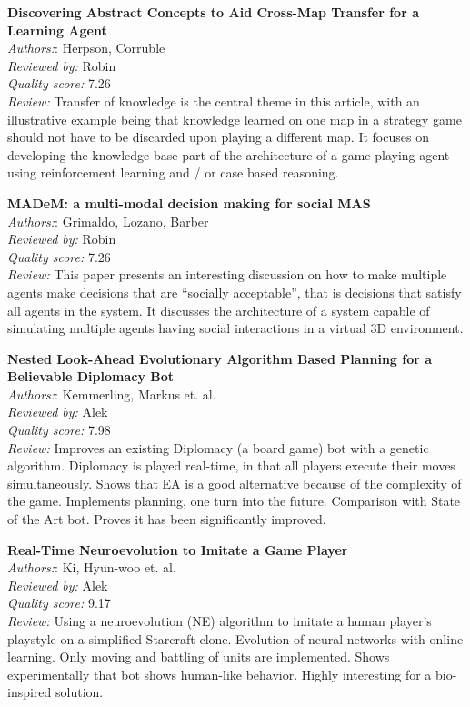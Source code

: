 \textbf{Discovering Abstract Concepts to Aid Cross-Map Transfer for a Learning Agent}\\
\textit{Authors:}: Herpson, Corruble\\
\textit{Reviewed by:} Robin\\
\textit{Quality score:} 7.26\\
\textit{Review:} Transfer of knowledge is the central theme in this article, with an illustrative example being that knowledge learned on one map in a strategy game should not have to be discarded upon playing a different map. It focuses on developing the knowledge base part of the architecture of a game-playing agent using reinforcement learning and / or case based reasoning.

\textbf{MADeM: a multi-modal decision making for social MAS}\\
\textit{Authors:}: Grimaldo, Lozano, Barber\\
\textit{Reviewed by:} Robin\\
\textit{Quality score:} 7.26\\
\textit{Review:} This paper presents an interesting discussion on how to make multiple agents make decisions that are ``socially acceptable'', that is decisions that satisfy all agents in the system. It discusses the architecture of a system capable of simulating multiple agents having social interactions in a virtual 3D environment. 

\textbf{Nested Look-Ahead Evolutionary Algorithm Based Planning for a Believable Diplomacy Bot}\\
\textit{Authors:}: Kemmerling, Markus et. al.\\
\textit{Reviewed by:} Alek	\\
\textit{Quality score:} 7.98\\
\textit{Review:} Improves an existing Diplomacy (a board game) bot with a genetic algorithm. Diplomacy is played real-time, in that all players execute their moves simultaneously. Shows that EA is a good alternative because of the complexity of the game. Implements planning, one turn into the future. Comparison with State of the Art bot. Proves it has been significantly improved.

\textbf{Real-Time Neuroevolution to Imitate a Game Player}\\
\textit{Authors:}: Ki, Hyun-woo et. al.\\
\textit{Reviewed by:} Alek\\
\textit{Quality score:} 9.17\\
\textit{Review:} Using a neuroevolution (NE) algorithm to imitate a human player's playstyle on a simplified Starcraft clone. Evolution of neural networks with online learning. Only moving and battling of units are implemented. Shows experimentally that bot shows human-like behavior. Highly interesting for a bio-inspired solution.

